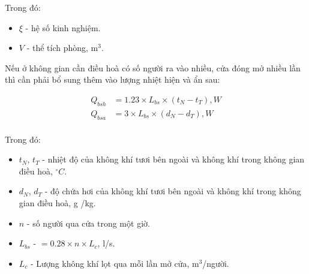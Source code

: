 Trong đó:
\begin{itemize}[leftmargin=2.2cm]
	\item $\xi$ - hệ số kinh nghiệm.
	\item $V$ - thể tích phòng, m$^3$.
\end{itemize}

Nếu ở không gian cần điều hoà có số người ra vào nhiều, cửa đóng mở nhiều lần thì cần phải bổ sung thêm vào lượng nhiệt hiện và ẩn sau:

\begin{equation*}
	\begin{split}
		Q_{bsh} &= 1.23\times L_{bs}\times (t_{N} - t_{T}), W\\
		Q_{bsa} &= 3\times L_{bs}\times (d_{N} - d_{T}), W\\
	\end{split}
\end{equation*}

Trong đó:
\begin{itemize}[leftmargin=2.2cm]
	\item $t_{N}$, $t_{T}$ - nhiệt độ của không khí tươi bên ngoài và không khí trong không gian điều hoà, $^{\circ}C$.
	\item $d_{N}$, $d_{T}$ - độ chứa hơi của không khí tươi bên ngoài và không khí trong không gian điều hoà, g /kg.
	\item $ n $ - số người qua cửa trong một giờ.
	\item $L_{bs}$ - $= 0.28\times n\times L_{c}$, l/s.
	\item $L_{c}$ - Lượng không khí lọt qua mỗi lần mở cửa, m$^3$/người. 
\end{itemize}

